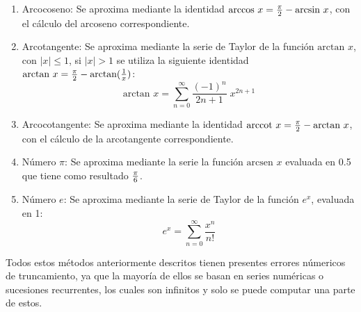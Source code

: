 \documentclass[a4paper,10pt,twocolumn]{article}
\begin{document}
\begin{enumerate}
  		\item Arcocoseno: Se aproxima mediante la identidad $\text{arccos }x={\pi \over 2}-\text{arcsin }x$, con el cálculo del arcoseno correspondiente.
  		
  		\item Arcotangente: Se aproxima mediante la serie de Taylor de la función $\text{arctan }x$, con $|x| \leq 1$, si $|x| > 1$ se utiliza la siguiente identidad $\text{arctan }x={\pi \over 2}-\text{arctan}({1 \over x})$:
  			\begin{equation}
  				\text{arctan }x=\sum _{n=0}^{\infty }{\frac {(-1)^{n}}{2n+1}}\;x^{2n+1}
  			\end{equation}
  			
  		\item Arcocotangente: Se aproxima mediante la identidad $\text{arccot }x={\pi \over 2}-\text{arctan }x$, con el cálculo de la arcotangente correspondiente.
  		
  		\item Número $\pi$: Se aproxima mediante la serie la función $\text{arcsen }x$ evaluada en 0.5 que tiene como resultado $\pi\over 6$.
  		
  		\item Número $e$: Se aproxima mediante la serie de Taylor de la función $e^x$, evaluada en 1:
  			\begin{equation}
  				e^{x}=\sum _{n=0}^{\infty }{\frac {x^{n}}{n!}}
  			\end{equation}
  	\end{enumerate}
  			
  	Todos estos métodos anteriormente descritos tienen presentes errores númericos de truncamiento, ya que la mayoría de ellos se basan en series numéricas o sucesiones recurrentes, los cuales son infinitos y solo se puede computar una parte de estos.
	

\end{document}
